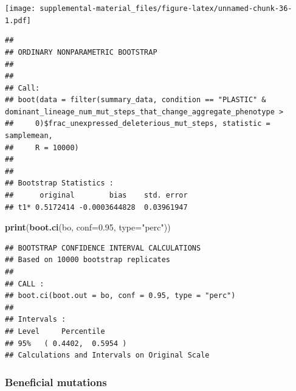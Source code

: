 \documentclass[]{book}
\newenvironment{Shaded}{\begin{snugshade}}{\end{snugshade}}
\newcommand{\DataTypeTok}[1]{\textcolor[rgb]{0.13,0.29,0.53}{#1}}
\newcommand{\DecValTok}[1]{\textcolor[rgb]{0.00,0.00,0.81}{#1}}
\newcommand{\FloatTok}[1]{\textcolor[rgb]{0.00,0.00,0.81}{#1}}
\newcommand{\KeywordTok}[1]{\textcolor[rgb]{0.13,0.29,0.53}{\textbf{#1}}}
\newcommand{\NormalTok}[1]{#1}
\newcommand{\OperatorTok}[1]{\textcolor[rgb]{0.81,0.36,0.00}{\textbf{#1}}}
\newcommand{\StringTok}[1]{\textcolor[rgb]{0.31,0.60,0.02}{#1}}
\begin{document}
\texttt{[image: supplemental-material\_files/figure-latex/unnamed-chunk-36-1.pdf]}

\begin{Shaded}
\end{Shaded}

\begin{verbatim}
## 
## ORDINARY NONPARAMETRIC BOOTSTRAP
## 
## 
## Call:
## boot(data = filter(summary_data, condition == "PLASTIC" & dominant_lineage_num_mut_steps_that_change_aggregate_phenotype > 
##     0)$frac_unexpressed_deleterious_mut_steps, statistic = samplemean, 
##     R = 10000)
## 
## 
## Bootstrap Statistics :
##      original        bias    std. error
## t1* 0.5172414 -0.0003644828  0.03961947
\end{verbatim}

\begin{Shaded}
\begin{Highlighting}[]
\KeywordTok{print}\NormalTok{(}\KeywordTok{boot.ci}\NormalTok{(bo, }\DataTypeTok{conf=}\FloatTok{0.95}\NormalTok{, }\DataTypeTok{type=}\StringTok{"perc"}\NormalTok{))}
\end{Highlighting}
\end{Shaded}

\begin{verbatim}
## BOOTSTRAP CONFIDENCE INTERVAL CALCULATIONS
## Based on 10000 bootstrap replicates
## 
## CALL : 
## boot.ci(boot.out = bo, conf = 0.95, type = "perc")
## 
## Intervals : 
## Level     Percentile     
## 95%   ( 0.4402,  0.5954 )  
## Calculations and Intervals on Original Scale
\end{verbatim}

\hypertarget{beneficial-mutations}{%
\subsubsection{Beneficial mutations}\label{beneficial-mutations}}
\end{document}
